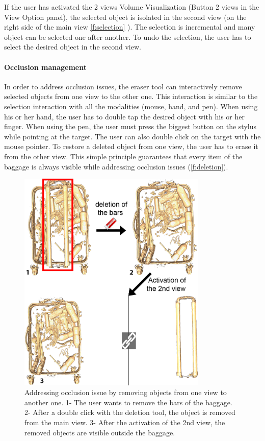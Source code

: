 If the user has activated the 2 views Volume Visualization (Button 2 views in the View Option panel), the selected object is isolated in the second view (on the right side of the main view \autoref{f:selection} ). The selection is incremental and many object can be selected one after another. To undo the selection, the user has to select the desired object in the second view.

\paragraph{Occlusion management}

In order to address occlusion issues, the eraser tool can interactively remove selected objects from one view to the other one. This interaction is similar to the selection interaction with all the modalities (mouse, hand, and pen). When using his or her hand, the user has to double tap the desired object with his or her finger. When using the pen, the user must press the biggest button on the stylus while pointing at the target. The user can also double click on the target with the mouse pointer. To restore a deleted object from one view, the user has to erase it from the other view. This simple principle guarantees that every item of the baggage is always visible while addressing occlusion issues (\autoref{f:deletion}).

\begin{figure}
\centering   	\includegraphics[width=9cm]{Figures/deletion.png}
	\caption[ Addressing occlusion issue by removing objects from one view to another one.]{ Addressing occlusion issue by removing objects from one view to another one. 1- The user wants to remove the bars of the baggage. 2- After a double click with the deletion tool, the object is removed from the main view. 3- After the activation of the 2nd view, the removed objects are visible outside the baggage.}
	\label{f:deletion}
\end{figure}

